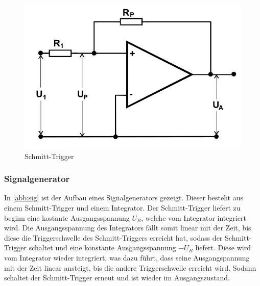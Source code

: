 \begin{figure}[h!]
 	\centering
 	\includegraphics[width=\textwidth]{img/schmitt.png}
 	\caption{Schmitt-Trigger \cite{FP}}
 	\label{abb:sch}
\end{figure}

\subsubsection{Signalgenerator}
In \autoref{abb:sig} ist der Aufbau eines Signalgenerators gezeigt. Dieser besteht aus einem Schmitt-Trigger und einem Integrator. Der Schmitt-Trigger liefert zu beginn eine kostante Ausgangsspannung $U_B$,
welche vom Integrator integriert wird. Die Ausgangsspannung des Integrators fällt somit linear mit der Zeit, bis diese die Triggerschwelle des Schmitt-Triggers erreicht hat, sodass der Schmitt-Trigger schaltet und eine konstante Ausgangsspannung $-U_B$ liefert. Diese wird vom Integrator wieder integriert, was dazu führt, dass seine Ausgangspannung mit der Zeit linear ansteigt, bis die andere Triggerschwelle erreicht wird. Sodann schaltet der Schmitt-Trigger erneut und ist wieder im Ausgangszustand.

